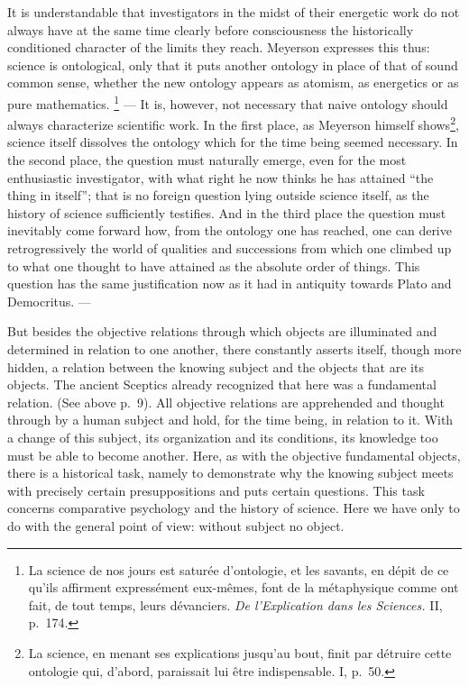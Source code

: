 \documentclass[12pt]{article}
\newcommand{\opage}[1]{\marginnote{\footnotesize\textit{[#1]}}}
\begin{document}
It is understandable that investigators in the midst of their energetic work
do not always have at the same time clearly before consciousness the
historically conditioned character of the limits they reach. Meyerson
expresses this thus: science is ontological, only that it puts another
ontology in place of that of sound common sense, whether the new ontology
appears as atomism, as energetics or as pure mathematics.%
\footnote{La science de nos jours est saturée d'ontologie, et les savants,
en dépit de ce qu'ils affirment expressément eux-mêmes, font de la
métaphysique comme ont fait, de tout temps, leurs dévanciers. \textit{De
l'Explication dans les Sciences.} II, p.~174.}
--- It is, however, not necessary that naive ontology should always
characterize scientific work. In the first place, as Meyerson himself
shows\footnote{La science, en menant ses explications jusqu'au bout, finit
par détruire cette ontologie qui, d'abord, paraissait lui être
indispensable. I, p.~50.}, science itself dissolves the ontology which for
the time being seemed necessary. In the second place, the question must
naturally emerge, even for the most enthusiastic investigator, with what
right he now thinks he has attained ``the thing in itself''; that is no
foreign question lying outside science itself, as the history of science
sufficiently testifies. And in the third place the question must inevitably
come forward how, from the ontology one has reached, one can derive
retrogressively the \opage{60}world of qualities and successions from which one
climbed up to what one thought to have attained as the absolute order of
things. This question has the same justification now as it had in antiquity
towards Plato and Democritus. ---

But besides the objective relations through which objects are illuminated
and determined in relation to one another, there constantly asserts itself,
though more hidden, a relation between the knowing subject and the objects
that are its objects. The ancient Sceptics already recognized that here was
a fundamental relation. (See above p.~9). All objective relations are
apprehended and thought through by a human subject and hold, for the time
being, in relation to it. With a change of this subject, its organization
and its conditions, its knowledge too must be able to become another. Here,
as with the objective fundamental objects, there is a historical task,
namely to demonstrate why the knowing subject meets with precisely certain
presuppositions and puts certain questions. This task concerns comparative
psychology and the history of science. Here we have only to do with the
general point of view: without subject no object.
\end{document}
